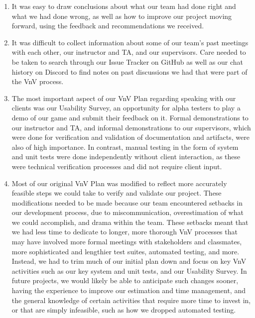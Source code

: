 \documentclass[12pt, titlepage]{article}
\begin{document}
\begin{enumerate}
  \item It was easy to draw conclusions about what our team had done right and
  what we had done wrong, as well as how to improve our project moving forward,
  using the feedback and recommendations we received.
  \item It was difficult to collect information about some of our team's past meetings
  with each other, our instructor and TA, and our supervisors. Care needed to be taken
  to search through our Issue Tracker on GitHub as well as our chat history on Discord
  to find notes on past discussions we had that were part of the VnV process.
  \item The most important aspect of our VnV Plan regarding speaking with our clients
  was our Usability Survey, an opportunity for alpha testers to play a demo of our game
  and submit their feedback on it. Formal demonstrations to our instructor and TA, and
  informal demonstrations to our supervisors, which were done for verification and validation
  of documentation and artifacts, were also of high importance. In contrast, manual testing
  in the form of system and unit tests were done independently without client interaction,
  as these were technical verification processes and did not require client input.
  \item Most of our original VnV Plan was modified to reflect more accurately feasible steps
  we could take to verify and validate our project. These modifications needed to be made
  because our team encountered setbacks in our development process, due to miscommunication,
  overestimation of what we could accomplish, and drama within the team. These setbacks meant
  that we had less time to dedicate to longer, more thorough VnV processes that may have involved
  more formal meetings with stakeholders and classmates, more sophisticated and lengthier test suites,
  automated testing, and more. Instead, we had to trim much of our initial plan down and focus
  on key VnV activities such as our key system and unit tests, and our Usability Survey.
  In future projects, we would likely be able to anticipate such changes sooner, having the
  experience to improve our estimation and time management, and the general knowledge of certain
  activities that require more time to invest in, or that are simply infeasible, such as how
  we dropped automated testing.
\end{enumerate}
\end{document}
